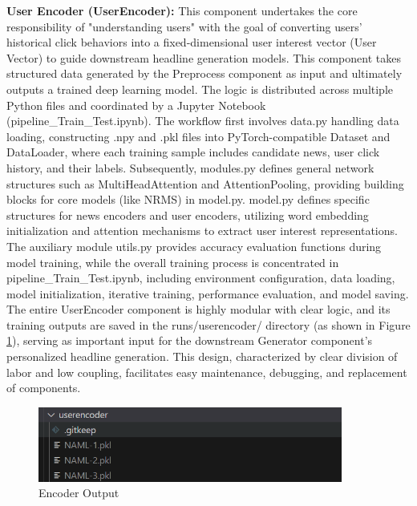 \documentclass[10pt,a4paper]{article}
\begin{document}
\textbf{User Encoder (UserEncoder):}
This component undertakes the core responsibility of "understanding users" with the goal of converting users' historical click behaviors into a fixed-dimensional user interest vector (User Vector) to guide downstream headline generation models. This component takes structured data generated by the Preprocess component as input and ultimately outputs a trained deep learning model. The logic is distributed across multiple Python files and coordinated by a Jupyter Notebook (pipeline\_Train\_Test.ipynb). The workflow first involves data.py handling data loading, constructing .npy and .pkl files into PyTorch-compatible Dataset and DataLoader, where each training sample includes candidate news, user click history, and their labels. Subsequently, modules.py defines general network structures such as MultiHeadAttention and AttentionPooling, providing building blocks for core models (like NRMS) in model.py. model.py defines specific structures for news encoders and user encoders, utilizing word embedding initialization and attention mechanisms to extract user interest representations. The auxiliary module utils.py provides accuracy evaluation functions during model training, while the overall training process is concentrated in pipeline\_Train\_Test.ipynb, including environment configuration, data loading, model initialization, iterative training, performance evaluation, and model saving. The entire UserEncoder component is highly modular with clear logic, and its training outputs are saved in the runs/userencoder/ directory (as shown in Figure \ref{fig:user_encode}), serving as important input for the downstream Generator component's personalized headline generation. This design, characterized by clear division of labor and low coupling, facilitates easy maintenance, debugging, and replacement of components.

\begin{figure}[H]
  \centering
  \includegraphics[width=10cm]{fig/user_encode.png}
  \caption{Encoder Output}\label{fig:user_encode}
\end{figure}
\end{document}
